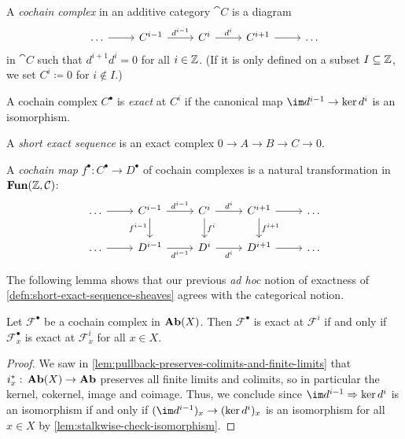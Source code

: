 \begin{defn}
A \emph{cochain complex} in an additive category \(\cat C\) is a diagram
\begin{equation*}
  \begin{tikzcd}
    \ldots \ar[r] & C^{i-1} \ar[r, "d^{i-1}"] & C^i \ar[r, "d^i"] & C^{i+1} \ar[r] & \ldots
  \end{tikzcd}
\end{equation*}
in \(\cat C\) such that \(d^{i+1}d^i=0\) for all \(i\in\mathbb{Z}\).
(If it is only defined on a subset \(I\subseteq\mathbb{Z}\), we set \(C^i\coloneq 0\) for \(i\notin I\).)

A cochain complex \(C^\bullet\) is \emph{exact} at \(C^i\) if the canonical map \(\im d^{i-1}\to\ker d^i\) is an isomorphism.

A \emph{short exact sequence} is an exact complex \(0\to A\to B\to C\to 0\).

A \emph{cochain map} \(f^\bullet\colon C^\bullet\to D^\bullet\) of cochain complexes is a natural transformation in \(\operatorname{\mathbf{Fun}}(\mathbb{Z},\mathcal{C})\):
\begin{equation*}
  \begin{tikzcd}
    \ldots \ar[r] & C^{i-1} \ar[r, "d^{i-1}"] \ar[d, "f^{i-1}"'] & C^i \ar[r, "d^i"] \ar[d, "f^i"] & C^{i+1} \ar[r] \ar[d, "f^{i+1}"] & \ldots \\
    \ldots \ar[r] & D^{i-1} \ar[r, "d^{i-1}"'] & D^i \ar[r, "d^i"'] & D^{i+1} \ar[r] & \ldots
  \end{tikzcd}
\end{equation*}
\end{defn}

The following lemma shows that our previous \emph{ad hoc} notion of exactness of \cref{defn:short-exact-sequence-sheaves} agrees with the categorical notion.

\begin{lem}
Let \(\mathcal F^\bullet\) be a cochain complex in \(\operatorname{\mathbf{Ab}}(X)\).
Then \(\mathcal F^\bullet\) is exact at \(\mathcal F^i\) if and only if \(\mathcal F^\bullet_x\) is exact at \(\mathcal F^i_x\) for all \(x\in X\).
\end{lem}

\begin{proof}
We saw in \cref{lem:pullback-preserves-colimits-and-finite-limits} that \(i_x^*\colon\catAbelianSheaf(X)\to\catAbelianGroup\) preserves all finite limits and colimits, so in particular the kernel, cokernel, image and coimage.
Thus, we conclude since \(\im d^{i-1}\To\ker d^i\) is an isomorphism if and only if \((\im d^{i-1})_x\to(\ker d^i)_x\) is an isomorphism for all \(x\in X\) by \cref{lem:stalkwise-check-isomorphism}.
\end{proof}

